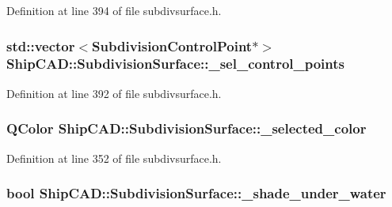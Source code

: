 Definition at line 394 of file subdivsurface.\-h.

\hypertarget{classShipCAD_1_1SubdivisionSurface_aefa02ffcdf17a06acd80f4274e509981}{
\subsubsection[{\-\_\-sel\-\_\-control\-\_\-points}]{\setlength{\rightskip}{0pt plus 5cm}std\-::vector$<${\bf Subdivision\-Control\-Point}$\ast$$>$ Ship\-C\-A\-D\-::\-Subdivision\-Surface\-::\-\_\-sel\-\_\-control\-\_\-points\hspace{0.3cm}{\ttfamily [protected]}}}\label{classShipCAD_1_1SubdivisionSurface_aefa02ffcdf17a06acd80f4274e509981}


Definition at line 392 of file subdivsurface.\-h.

\hypertarget{classShipCAD_1_1SubdivisionSurface_a3cfcbbe769216c753330f71e57a4cf4d}{
\subsubsection[{\-\_\-selected\-\_\-color}]{\setlength{\rightskip}{0pt plus 5cm}Q\-Color Ship\-C\-A\-D\-::\-Subdivision\-Surface\-::\-\_\-selected\-\_\-color\hspace{0.3cm}{\ttfamily [protected]}}}\label{classShipCAD_1_1SubdivisionSurface_a3cfcbbe769216c753330f71e57a4cf4d}


Definition at line 352 of file subdivsurface.\-h.

\hypertarget{classShipCAD_1_1SubdivisionSurface_ac3294d41679de31e588d603e3428565e}{
\subsubsection[{\-\_\-shade\-\_\-under\-\_\-water}]{\setlength{\rightskip}{0pt plus 5cm}bool Ship\-C\-A\-D\-::\-Subdivision\-Surface\-::\-\_\-shade\-\_\-under\-\_\-water\hspace{0.3cm}{\ttfamily [protected]}}}\label{classShipCAD_1_1SubdivisionSurface_ac3294d41679de31e588d603e3428565e}


